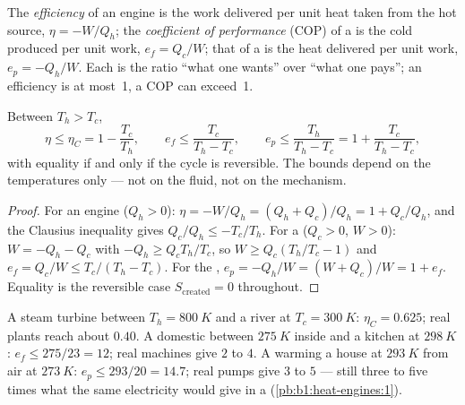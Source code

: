 \begin{definition}\label{def:b1:heat-engines:efficiency}
The \emph{efficiency} of an engine is the work delivered per unit heat
taken from the hot source, $\eta = -W/Q_h$; the
\emph{coefficient of performance} (COP) of a  is the cold
produced per unit work, $e_f = Q_c/W$; that of a  is the heat
delivered per unit work, $e_p = -Q_h/W$. Each is the ratio ``what one
wants'' over ``what one pays''; an efficiency is at most~1, a COP can
exceed~1.
\end{definition}

\begin{theorem}[Carnot]\label{thm:b1:heat-engines:carnot}
Between  $T_h > T_c$,
\[
\eta \leq \eta_C = 1 - \frac{T_c}{T_h}, \qquad
e_f \leq \frac{T_c}{T_h - T_c}, \qquad
e_p \leq \frac{T_h}{T_h - T_c} = 1 + \frac{T_c}{T_h - T_c},
\]
with equality if and only if the cycle is reversible. The bounds depend
on the temperatures only --- not on the fluid, not on the mechanism.
\end{theorem}

\begin{proof}
For an engine ($Q_h > 0$): $\eta = -W/Q_h = (Q_h + Q_c)/Q_h = 1 + Q_c/Q_h$,
and the Clausius inequality gives $Q_c/Q_h \leq -T_c/T_h$. For a
 ($Q_c > 0$, $W > 0$): $W = -Q_h - Q_c$ with $-Q_h \geq Q_c T_h/T_c$,
so $W \geq Q_c(T_h/T_c - 1)$ and $e_f = Q_c/W \leq T_c/(T_h - T_c)$.
For the , $e_p = -Q_h/W = (W + Q_c)/W = 1 + e_f$. Equality is
the reversible case $S_{\mathrm{created}} = 0$ throughout.
\end{proof}

\begin{example}\label{ex:b1:heat-engines:numbers}
A steam turbine between $T_h = \qty{800}{K}$ and a river at
$T_c = \qty{300}{K}$: $\eta_C = 0.625$; real plants reach about $0.40$.
A domestic  between $\qty{275}{K}$ inside and a kitchen at
$\qty{298}{K}$: $e_f \leq 275/23 = 12$; real machines give $2$ to $4$. A
 warming a house at $\qty{293}{K}$ from air at $\qty{273}{K}$:
$e_p \leq 293/20 = 14.7$; real pumps give $3$ to $5$ --- still three to
five times what the same electricity would give in a 
(\cref{pb:b1:heat-engines:1}).
\end{example}


